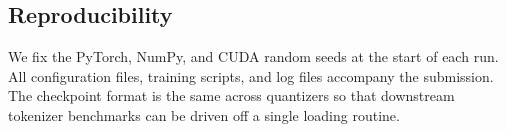 \subsection{Reproducibility}

We fix the PyTorch, NumPy, and CUDA random seeds at the start of each
run. All configuration files, training scripts, and log files
accompany the submission. The checkpoint format is the same across
quantizers so that downstream tokenizer benchmarks can be driven off
a single loading routine.
